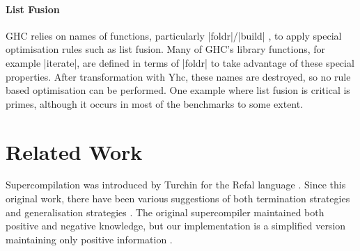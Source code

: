 \paragraph{List Fusion} GHC relies on names of functions, particularly |foldr|/|build| \cite{spj:rules}, to apply special optimisation rules such as list fusion. Many of GHC's library functions, for example |iterate|, are defined in terms of |foldr| to take advantage of these special properties. After transformation with Yhc, these names are destroyed, so no rule based optimisation can be performed. One example where list fusion is critical is primes, although it occurs in most of the benchmarks to some extent.

\begin{comment}
\subsection{Termination Bound}
\label{sec:results_bound}

Table \ref{tab:haskell_results} includes a column indicating the size bound that was applied to expressions. Out of the five benchmarks, both primes and queens could be run at any greater bound and would still produce the same program -- the direct repetition criteria (see \S\ref{sec:direct}) bounds the expressions on its own. For the remaining programs, a bound was chosen to ensure that the compilation process was quick (under two seconds). By increasing the termination bound the size of the residual program would increase, but the generated program may execute faster.

The existence of a termination bound requiring different values for different programs is a cause for concern. In a large program it is likely that different parts of the program would require different bounds on the size of the generated expression -- something not currently possible. We suspect that the most promising direction is to augment the direct repetition criterion to obtain termination in all practical cases without resorting to a depth bound.
\end{comment}

\section{Related Work}
\label{sec:related}

Supercompilation \cite{supercompilation,turchin:experiments} was introduced by Turchin for the Refal language \cite{refal}. Since this original work, there have been various suggestions of both termination strategies and generalisation strategies \cite{turchin:generalisation,sorensen:supercompilation,leuschel:homeomorphic}. The original supercompiler maintained both positive and negative knowledge, but our implementation is a simplified version maintaining only positive information \cite{secher:perfect_supercompilation}.

